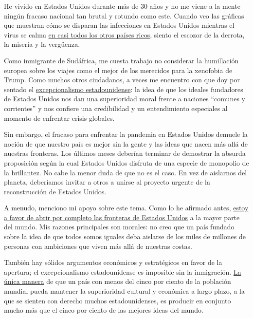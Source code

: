 He vivido en Estados Unidos durante más de 30 años y no me viene a la
mente ningún fracaso nacional tan brutal y rotundo como este. Cuando veo
las gráficas que muestran cómo se disparan las infecciones en Estados
Unidos mientras el virus se calma
\href{https://www.nytimes3xbfgragh.onion/2020/06/29/briefing/coronavirus-mississippi-new-england-patriots-your-monday-briefing.html}{en
casi todos los otros países ricos}, siento el escozor de la derrota, la
miseria y la vergüenza.

Como inmigrante de Sudáfrica, me cuesta trabajo no considerar la
humillación europea sobre los viajes como el mejor de los merecidos para
la xenofobia de Trump. Como muchos otros ciudadanos, a veces me
encuentro con que doy por sentado el
\href{https://theweek.com/articles/654508/what-exactly-american-exceptionalism}{excepcionalismo
estadounidense}: la idea de que los ideales fundadores de Estados Unidos
nos dan una superioridad moral frente a naciones ``comunes y
corrientes'' y nos confiere una credibilidad y un entendimiento
especiales al momento de enfrentar crisis globales.

Sin embargo, el fracaso para enfrentar la pandemia en Estados Unidos
demuele la noción de que nuestro país es mejor sin la gente y las ideas
que nacen más allá de nuestras fronteras. Los últimos meses deberían
terminar de demostrar la absurda proposición según la cual Estados
Unidos disfruta de una especie de monopolio de la brillantez. No cabe la
menor duda de que no es el caso. En vez de aislarnos del planeta,
deberíamos invitar a otros a unirse al proyecto urgente de la
reconstrucción de Estados Unidos.

A menudo, menciono mi apoyo sobre este tema. Como lo he afirmado antes,
\href{https://www.nytimes3xbfgragh.onion/es/2019/01/22/espanol/opinion/fronteras-abiertas-muro-fronterizo.html}{estoy
a favor de abrir por completo las fronteras de Estados Unidos} a la
mayor parte del mundo. Mis razones principales son morales: no creo que
un país fundado sobre la idea de que todos somos iguales deba aislarse
de los miles de millones de personas con ambiciones que viven más allá
de nuestras costas.

También hay sólidos argumentos económicos y estratégicos en favor de la
apertura; el excepcionalismo estadounidense es imposible sin la
inmigración. \href{http://paulgraham.com/95.html}{La única manera} de
que un país con menos del cinco por ciento de la población mundial pueda
mantener la superioridad cultural y económica a largo plazo, a la que se
sienten con derecho muchos estadounidenses, es producir en conjunto
mucho más que el cinco por ciento de las mejores ideas del mundo.

